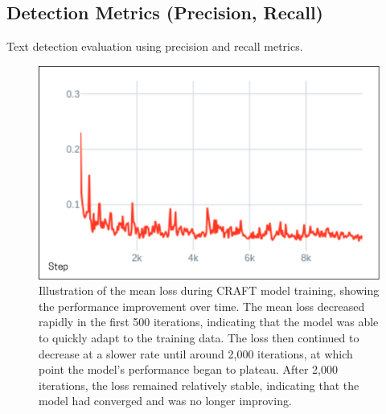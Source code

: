 \subsection{Detection Metrics (Precision, Recall)}
\label{subsec:detection-metrics}
Text detection evaluation using precision and recall metrics.

\begin{figure}[H]
    \centering
    \includegraphics[width=\textwidth]{figures/mean_loss_craft.png}
    \caption{Illustration of the mean loss during CRAFT model training, showing the performance 
    improvement over time. The mean loss decreased rapidly in the first 500 iterations, 
    indicating that the model was able to quickly adapt to the training data. The loss then 
    continued to decrease at a slower rate until around 2,000 iterations, at which point 
    the model's performance began to plateau. After 2,000 iterations, the loss remained 
    relatively stable, indicating that the model had converged and was no longer improving.}
    \label{fig:mean-loss-craft}
\end{figure}

